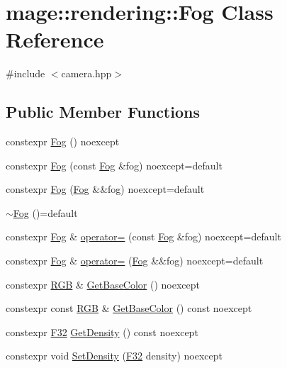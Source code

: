 \hypertarget{classmage_1_1rendering_1_1_fog}{}\section{mage\+:\+:rendering\+:\+:Fog Class Reference}
\label{classmage_1_1rendering_1_1_fog}


{\ttfamily \#include $<$camera.\+hpp$>$}

\subsection*{Public Member Functions}
\begin{DoxyCompactItemize}
\item 
constexpr \hyperlink{classmage_1_1rendering_1_1_fog_a48489b0ce940aff4395eb5ea88394081}{Fog} () noexcept
\item 
constexpr \hyperlink{classmage_1_1rendering_1_1_fog_a2f730d70ed426468f113d44e7810394b}{Fog} (const \hyperlink{classmage_1_1rendering_1_1_fog}{Fog} \&fog) noexcept=default
\item 
constexpr \hyperlink{classmage_1_1rendering_1_1_fog_aeed9b3fc18dabe37199c51ed7c4f5930}{Fog} (\hyperlink{classmage_1_1rendering_1_1_fog}{Fog} \&\&fog) noexcept=default
\item 
\hyperlink{classmage_1_1rendering_1_1_fog_a3dfb641a2c5688172e3c4be7c91631a2}{$\sim$\+Fog} ()=default
\item 
constexpr \hyperlink{classmage_1_1rendering_1_1_fog}{Fog} \& \hyperlink{classmage_1_1rendering_1_1_fog_a6197ad3df06e461c7cb2f5028f8cd901}{operator=} (const \hyperlink{classmage_1_1rendering_1_1_fog}{Fog} \&fog) noexcept=default
\item 
constexpr \hyperlink{classmage_1_1rendering_1_1_fog}{Fog} \& \hyperlink{classmage_1_1rendering_1_1_fog_ae0b197b983b73f78782fecfc491ddd1c}{operator=} (\hyperlink{classmage_1_1rendering_1_1_fog}{Fog} \&\&fog) noexcept=default
\item 
constexpr \hyperlink{structmage_1_1_r_g_b}{R\+GB} \& \hyperlink{classmage_1_1rendering_1_1_fog_af2ba57f86df0f681ad6b67cba5fc8dc1}{Get\+Base\+Color} () noexcept
\item 
constexpr const \hyperlink{structmage_1_1_r_g_b}{R\+GB} \& \hyperlink{classmage_1_1rendering_1_1_fog_a2a1441d2a0cdbc074260fa1af7fc656a}{Get\+Base\+Color} () const noexcept
\item 
constexpr \hyperlink{namespacemage_aa97e833b45f06d60a0a9c4fc22ae02c0}{F32} \hyperlink{classmage_1_1rendering_1_1_fog_ac99a5479a39027723807296c49fdfbc8}{Get\+Density} () const noexcept
\item 
constexpr void \hyperlink{classmage_1_1rendering_1_1_fog_a9b498c71c58e28bd58b09e4385338a13}{Set\+Density} (\hyperlink{namespacemage_aa97e833b45f06d60a0a9c4fc22ae02c0}{F32} density) noexcept
\end{DoxyCompactItemize}
